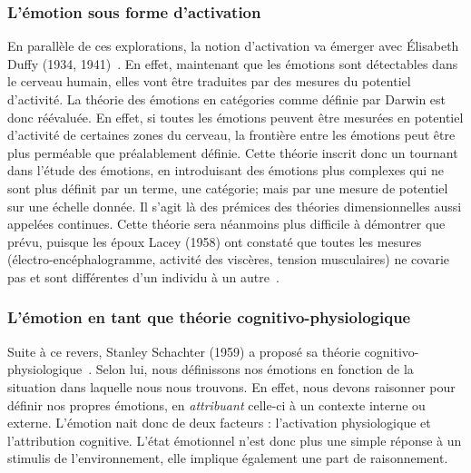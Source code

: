 \subsubsection{L'émotion sous forme d'activation}
En parallèle de ces explorations, la notion d'activation va émerger avec Élisabeth Duffy (1934, 1941)~\cite{Duffy1934,Duffy1941}. En effet, maintenant que les émotions sont détectables dans le cerveau humain, elles vont être traduites par des mesures du potentiel d'activité. La théorie des émotions en catégories comme définie par Darwin est donc réévaluée. En effet, si toutes les émotions peuvent être mesurées en potentiel d'activité de certaines zones du cerveau, la frontière entre les émotions peut être plus perméable que préalablement définie. Cette théorie inscrit donc un tournant dans l'étude des émotions, en introduisant des émotions plus complexes qui ne sont plus définit par un terme, une catégorie; mais par une mesure de potentiel sur une échelle donnée. Il s'agit là des prémices des théories dimensionnelles aussi appelées continues.
Cette théorie sera néanmoins plus difficile à démontrer que prévu, puisque les époux Lacey (1958) ont constaté que toutes les mesures (électro-encéphalogramme, activité des viscères, tension musculaires) ne covarie pas et sont différentes d'un individu à un autre~\cite{Lacey1958}.

\subsubsection{L'émotion en tant que théorie cognitivo-physiologique}
Suite à ce revers, Stanley Schachter (1959) a proposé sa théorie cognitivo-physiologique~\cite{Schachter1959,Schachter1962}. Selon lui, nous définissons nos émotions en fonction de la situation dans laquelle nous nous trouvons. En effet, nous devons raisonner pour définir nos propres émotions, en \textit{attribuant} celle-ci à un contexte interne ou externe. L'émotion nait donc de deux facteurs : l'activation physiologique et l'attribution cognitive. L'état émotionnel n'est donc plus une simple réponse à un stimulis de l'environnement, elle implique également une part de raisonnement.

